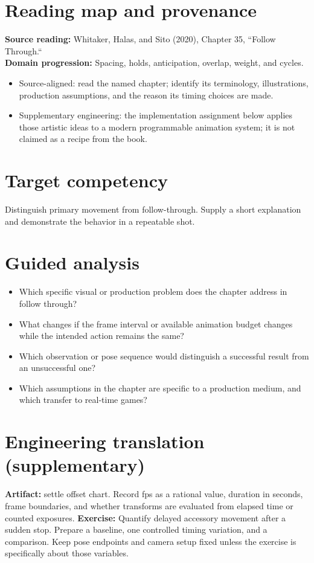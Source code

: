 \documentclass[10pt,letterpaper]{article}
\begin{document}
\makedoctitle
\makedocsummary

\section{Reading map and provenance}
\textbf{Source reading:} Whitaker, Halas, and Sito (2020), Chapter 35, ``Follow Through.``\\
\textbf{Domain progression:} Spacing, holds, anticipation, overlap, weight, and cycles.
\begin{itemize}
\item Source-aligned: read the named chapter; identify its terminology, illustrations, production assumptions, and the reason its timing choices are made.
\item Supplementary engineering: the implementation assignment below applies those artistic ideas to a modern programmable animation system; it is not claimed as a recipe from the book.
\end{itemize}
\section{Target competency}
Distinguish primary movement from follow-through. Supply a short explanation and demonstrate the behavior in a repeatable shot.
\section{Guided analysis}
\begin{itemize}
\item Which specific visual or production problem does the chapter address in follow through?
\item What changes if the frame interval or available animation budget changes while the intended action remains the same?
\item Which observation or pose sequence would distinguish a successful result from an unsuccessful one?
\item Which assumptions in the chapter are specific to a production medium, and which transfer to real-time games?
\end{itemize}
\section{Engineering translation (supplementary)}
\textbf{Artifact:} settle offset chart. Record fps as a rational value, duration in seconds, frame boundaries, and whether transforms are evaluated from elapsed time or counted exposures.
\textbf{Exercise:} Quantify delayed accessory movement after a sudden stop. Prepare a baseline, one controlled timing variation, and a comparison. Keep pose endpoints and camera setup fixed unless the exercise is specifically about those variables.
\end{document}
